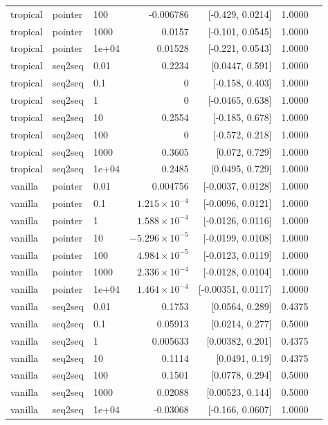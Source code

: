 \documentclass[10pt]{article}
\begin{document}
{\begin{longtable}{lllrrrl}
tropical & pointer & 100 & -0.006786 & [-0.429, 0.0214] & 1.0000 & \\
tropical & pointer & 1000 & 0.0157 & [-0.101, 0.0545] & 1.0000 & \\
tropical & pointer & 1e+04 & 0.01528 & [-0.221, 0.0543] & 1.0000 & \\
tropical & seq2seq & 0.01 & 0.2234 & [0.0447, 0.591] & 1.0000 & \\
tropical & seq2seq & 0.1 & 0 & [-0.158, 0.403] & 1.0000 & \\
tropical & seq2seq & 1 & 0 & [-0.0465, 0.638] & 1.0000 & \\
tropical & seq2seq & 10 & 0.2554 & [-0.185, 0.678] & 1.0000 & \\
tropical & seq2seq & 100 & 0 & [-0.572, 0.218] & 1.0000 & \\
tropical & seq2seq & 1000 & 0.3605 & [0.072, 0.729] & 1.0000 & \\
tropical & seq2seq & 1e+04 & 0.2485 & [0.0495, 0.729] & 1.0000 & \\
vanilla & pointer & 0.01 & 0.004756 & [-0.0037, 0.0128] & 1.0000 & \\
vanilla & pointer & 0.1 & $1.215\times10^{-4}$ & [-0.0096, 0.0121] & 1.0000 & \\
vanilla & pointer & 1 & $1.588\times10^{-4}$ & [-0.0126, 0.0116] & 1.0000 & \\
vanilla & pointer & 10 & $-5.296\times10^{-5}$ & [-0.0199, 0.0108] & 1.0000 & \\
vanilla & pointer & 100 & $4.984\times10^{-5}$ & [-0.0123, 0.0119] & 1.0000 & \\
vanilla & pointer & 1000 & $2.336\times10^{-4}$ & [-0.0128, 0.0104] & 1.0000 & \\
vanilla & pointer & 1e+04 & $1.464\times10^{-4}$ & [-0.00351, 0.0117] & 1.0000 & \\
vanilla & seq2seq & 0.01 & 0.1753 & [0.0564, 0.289] & 0.4375 & \\
vanilla & seq2seq & 0.1 & 0.05913 & [0.0214, 0.277] & 0.5000 & \\
vanilla & seq2seq & 1 & 0.005633 & [0.00382, 0.201] & 0.4375 & \\
vanilla & seq2seq & 10 & 0.1114 & [0.0491, 0.19] & 0.4375 & \\
vanilla & seq2seq & 100 & 0.1501 & [0.0778, 0.294] & 0.5000 & \\
vanilla & seq2seq & 1000 & 0.02088 & [0.00523, 0.144] & 0.5000 & \\
vanilla & seq2seq & 1e+04 & -0.03068 & [-0.166, 0.0607] & 1.0000 & \\
\bottomrule
\end{longtable}
}
\end{document}
